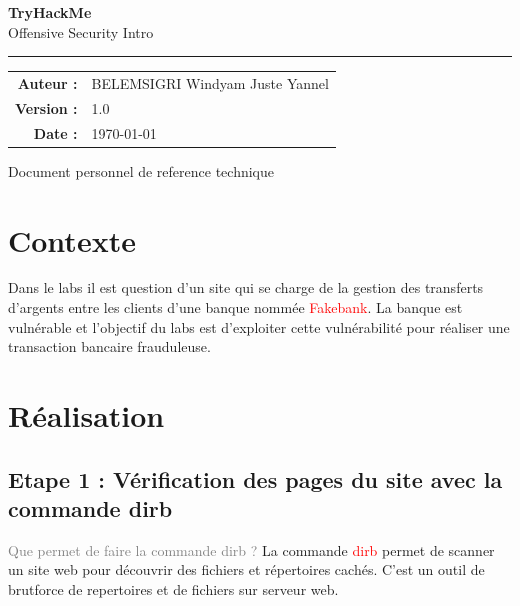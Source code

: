 \documentclass[11pt,a4paper]{book}
\begin{document}
\begin{titlepage}
\thispagestyle{empty}
\begin{center}
\vspace*{2cm}
{\Huge\sffamily\bfseries\color{bleuFonce} TryHackMe}\\[0.5em]
{\Large\sffamily\color{gris} Offensive Security Intro}
\vspace{1.5cm}

\textcolor{bleuClair}{\rule{0.3\textwidth}{1.5pt}}

\vspace{1.5cm}
\begin{tabular}{rl}
    \textcolor{gris}{\textbf{Auteur :}} & BELEMSIGRI Windyam Juste Yannel \\
    \textcolor{gris}{\textbf{Version :}} & 1.0 \\
    \textcolor{gris}{\textbf{Date :}} & \today \\
\end{tabular}

\vfill
{\small\sffamily\color{gris} Document personnel de reference technique}
\vspace{1cm}
\end{center}
\end{titlepage}

\tableofcontents
\newpage

\section{Contexte}

Dans le labs il est question d'un site qui se charge de la gestion des transferts d'argents 
entre les clients d'une banque nommée \textcolor{red}{Fakebank}. La banque est vulnérable et l'objectif du labs est 
d'exploiter cette vulnérabilité pour réaliser une transaction bancaire frauduleuse.

\section{Réalisation}
\subsection{Etape 1 : Vérification des pages du site avec la commande dirb}
\textcolor{gray}{Que permet de faire la commande dirb ?}
La commande \textcolor{red}{dirb} permet de scanner un site web pour découvrir des fichiers et répertoires cachés.
C'est un outil de brutforce de repertoires et de fichiers sur serveur web.
\end{document}

